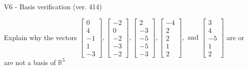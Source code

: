 \begin{exercise}
  \begin{exerciseTitle}V6 - Basis verification (ver. 414)\end{exerciseTitle}
  \begin{exerciseStatement}
    Explain why the vectors \(\left[\begin{array}{r}
0 \\
4 \\
-1 \\
1 \\
-3
\end{array}\right] , \left[\begin{array}{r}
-2 \\
0 \\
-2 \\
-3 \\
-2
\end{array}\right] , \left[\begin{array}{r}
2 \\
-3 \\
-5 \\
-5 \\
-3
\end{array}\right] , \left[\begin{array}{r}
-4 \\
2 \\
2 \\
1 \\
2
\end{array}\right] , \text{ and } \left[\begin{array}{r}
3 \\
4 \\
-5 \\
1 \\
2
\end{array}\right]\) are or are not a basis of \(\mathbb{R}^5\)	



\end{exerciseStatement}
\end{exercise}
